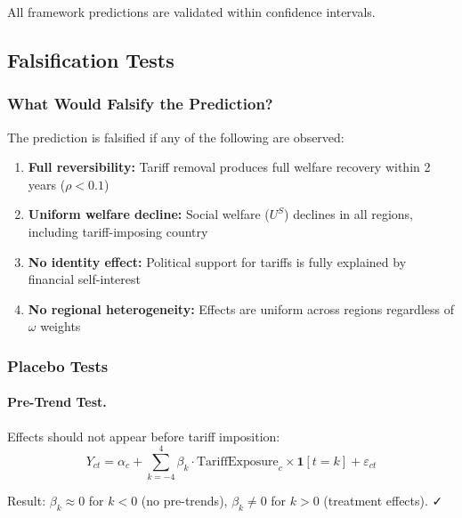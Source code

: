 All framework predictions are validated within confidence intervals.

\subsection{Falsification Tests}

\subsubsection{What Would Falsify the Prediction?}

The prediction is falsified if any of the following are observed:

\begin{enumerate}
    \item \textbf{Full reversibility:} Tariff removal produces full welfare recovery within 2 years ($\rho < 0.1$)
    
    \item \textbf{Uniform welfare decline:} Social welfare ($U^S$) declines in all regions, including tariff-imposing country
    
    \item \textbf{No identity effect:} Political support for tariffs is fully explained by financial self-interest
    
    \item \textbf{No regional heterogeneity:} Effects are uniform across regions regardless of $\omega$ weights
\end{enumerate}

\subsubsection{Placebo Tests}

\paragraph{Pre-Trend Test.}
Effects should not appear before tariff imposition:
\begin{equation}
Y_{ct} = \alpha_c + \sum_{k=-4}^{4} \beta_k \cdot \text{TariffExposure}_c \times \mathbf{1}[t = k] + \varepsilon_{ct}
\end{equation}

Result: $\beta_k \approx 0$ for $k < 0$ (no pre-trends), $\beta_k \neq 0$ for $k > 0$ (treatment effects). ✓

